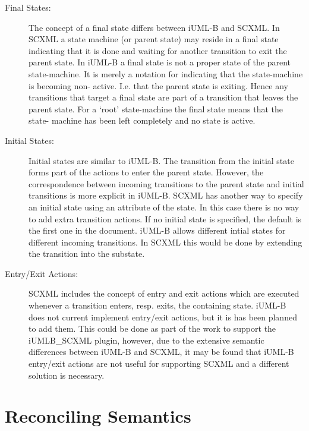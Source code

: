 \documentclass{easychair}
\begin{document}
\begin{description}
\item [Final States:]
The concept of a final state differs between iUML-B and 
SCXML. In SCXML a state machine (or parent state) may 
reside in a final state indicating that it is done and 
waiting for another transition to exit the parent 
state.  In iUML-B a final state is not a proper state 
of the parent state-machine. It is merely a notation 
for indicating that the state-machine is becoming non-
active. I.e. that the parent state is exiting. Hence 
any transitions that target a final state are part of a 
transition that leaves the parent state. For a ‘root’ 
state-machine the final state means that the state-
machine has been left completely and no state is active.

\item [Initial States:]
Initial states are similar to iUML-B. The transition 
from the initial state forms part of the actions to 
enter the parent state. However, the correspondence 
between incoming transitions to the parent state and 
initial transitions is more explicit in iUML-B. 
SCXML has another way to specify an initial state using 
an attribute of the state. In this case there is no way 
to add extra transition actions.
If no initial state is specified, the default is the 
first one in the document.
iUML-B allows different intial states for different 
incoming transitions. In SCXML this would be done by 
extending the transition into the substate.

\item [Entry/Exit Actions:]
SCXML includes the concept of entry and exit actions 
which are executed whenever a transition enters, resp. 
exits, the containing state. 
iUML-B does not current implement entry/exit actions,
but it is has been planned to add them.  This could be 
done as part of the work to support the iUMLB\_SCXML 
plugin, however, due to the extensive semantic 
differences between iUML-B and SCXML, it may be found 
that iUML-B entry/exit actions are not useful for 
supporting SCXML and a different solution is necessary.

\end{description}


\section{Reconciling Semantics}
\label{sect:recon}
\end{document}
